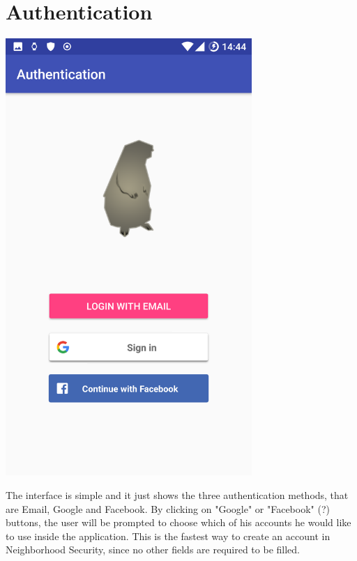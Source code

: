 \documentclass[a4paper]{scrreprt}
\begin{document}
\section{Authentication}
\begin{minipage}{0.5\textwidth}
	\centering
	\includegraphics[width=0.7\textwidth]{authentication}
\end{minipage}
\begin{minipage}{0.5\textwidth}
	The interface is simple and it just shows the three authentication methods, that are Email, Google and Facebook.
	By clicking on "Google" or "Facebook" (?) buttons, the user will be prompted to choose which of his accounts he would like to use inside the application. This is the fastest way to create an account in Neighborhood Security, since no other fields are required to be filled.
\end{minipage}
\end{document}
